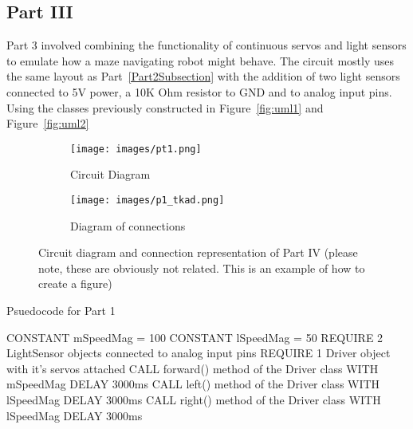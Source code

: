 \documentclass[journal]{IEEEtran}
\begin{document}
\subsection{Part III} \label{Part3Subsection}
Part 3 involved combining the functionality of continuous servos and light sensors to emulate how a maze navigating robot might behave. The circuit mostly uses the same layout as Part~\ref{Part2Subsection} with the addition of two light sensors connected to 5V power, a 10K Ohm resistor to GND and to analog input pins. Using the classes previously constructed in Figure~\ref{fig:uml1} and Figure~\ref{fig:uml2}

\begin{figure}[ht]
    \centering
      \begin{subfigure}[b]{0.2\textwidth}
         \centering
         \texttt{[image: images/pt1.png]} 
         \caption{Circuit Diagram}
         \label{fig:Circuit_diagram3}
     \end{subfigure}
     \begin{subfigure}[b]{0.2\textwidth}
         \centering
         \texttt{[image: images/p1\_tkad.png]} 
         \caption{Diagram of connections}
         \label{fig:connections3}
     \end{subfigure}  \hfill
    \caption{Circuit diagram and connection representation of Part IV (please note, these are obviously not related. This is an example of how to create a figure)}
    \label{fig:part3}
\end{figure}


\begin{algorithm}
\caption{Psuedocode for Part 1}\label{alg:part1}
\begin{algorithmic}[1]
\State CONSTANT mSpeedMag = 100
\State CONSTANT lSpeedMag = 50
\State REQUIRE 2 LightSensor objects connected to analog input pins
\State REQUIRE 1 Driver object with it's servos attached
    \State CALL forward() method of the Driver class WITH mSpeedMag
    \State DELAY 3000ms
    \State CALL left() method of the Driver class WITH lSpeedMag
    \State DELAY 3000ms
    \State CALL right() method of the Driver class WITH lSpeedMag
    \State DELAY 3000ms
\EndIf
\EndWhile
\end{algorithmic}
\end{algorithm}
\end{document}
